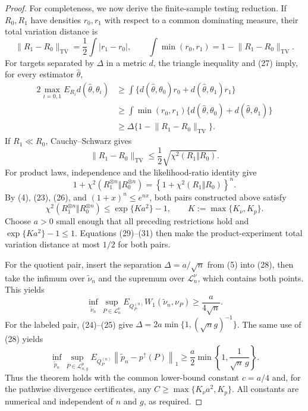 \documentclass{article}
\begin{document}
\begin{proof}
For completeness, we now derive the finite-sample testing reduction.  If \(R_0,R_1\) have densities \(r_0,r_1\) with respect to a common dominating measure, their total variation distance is
\[
 \lVert R_1-R_0\rVert_{\mathrm{TV}}
 =\frac12\int|r_1-r_0|,
 \qquad
 \int\min(r_0,r_1)=1-\lVert R_1-R_0\rVert_{\mathrm{TV}}.                        \tag{27}
\]
For targets separated by \(\Delta\) in a metric \(d\), the triangle inequality and (27) imply, for every estimator \(\widehat\theta\),
\[
 \begin{split}
 2\max_{i=0,1}E_{R_i}d(\widehat\theta,\theta_i)
 &\ge \int\{d(\widehat\theta,\theta_0)r_0
             +d(\widehat\theta,\theta_1)r_1\}\\
 &\ge \int\min(r_0,r_1)
             \{d(\widehat\theta,\theta_0)+d(\widehat\theta,\theta_1)\}\\
 &\ge \Delta\{1-\lVert R_1-R_0\rVert_{\mathrm{TV}}\}.                         \tag{28}
 \end{split}
\]
If \(R_1\ll R_0\), Cauchy--Schwarz gives
\[
 \lVert R_1-R_0\rVert_{\mathrm{TV}}
 \le\frac12\sqrt{\chi^2(R_1\Vert R_0)}.                                       \tag{29}
\]
For product laws, independence and the likelihood-ratio identity give
\[
 1+\chi^2(R_1^{\otimes n}\Vert R_0^{\otimes n})
 =\left\{1+\chi^2(R_1\Vert R_0)\right\}^{n}.                                  \tag{30}
\]
By (4), (23), (26), and \((1+x)^n\le e^{nx}\), both pairs constructed above satisfy
\[
 \chi^2(R_1^{\otimes n}\Vert R_0^{\otimes n})
 \le \exp\{K a^2\}-1,
 \qquad K:=\max\{K_\nu,K_p\}.                                                  \tag{31}
\]
Choose \(a>0\) small enough that all preceding restrictions hold and \(\exp\{Ka^2\}-1\le1\).  Equations (29)--(31) then make the product-experiment total variation distance at most \(1/2\) for both pairs.

For the quotient pair, insert the separation \(\Delta=a/\sqrt n\) from (5) into (28), then take the infimum over \(\widetilde\nu_n\) and the supremum over \(\mathcal L_n^\nu\), which contains both points.  This yields
\[
 \inf_{\widetilde\nu_n}\sup_{P\in\mathcal L_n^\nu}
 E_{Q_P^{(n)}}W_1(\widetilde\nu_n,\nu_P)
 \ge\frac{a}{4\sqrt n}.                                                         \tag{32}
\]
For the labeled pair, (24)--(25) give \(\Delta=2a\min\{1,(\sqrt n g)^{-1}\}\).  The same use of (28) yields
\[
 \inf_{\widetilde p_n}\sup_{P\in\mathcal L_{n,g}^p}
 E_{Q_P^{(n)}}\left\lVert\widetilde p_n-p^\uparrow(P)\right\rVert_1
 \ge\frac a2\min\left\{1,\frac1{\sqrt n\,g}\right\}.                       \tag{33}
\]
Thus the theorem holds with the common lower-bound constant \(c=a/4\) and, for the pathwise divergence certificates, any \(C\ge\max\{K_\nu a^2,K_p\}\).  All constants are numerical and independent of \(n\) and \(g\), as required.
\end{proof}
\end{document}
